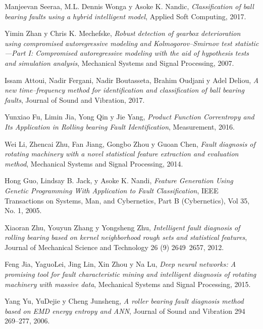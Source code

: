 \documentclass[12pt]{article}%
\begin{document}
\clearpage

\begin{thebibliography}{9}
Manjeevan Seeraa, M.L. Dennis Wonga y Asoke K. Nandic, \textit{Classification of ball bearing faults using a hybrid intelligent model}, Applied Soft Computing, 2017.

Yimin Zhan y Chris K. Mechefske, \textit{Robust detection of gearbox deterioration using compromised
autoregressive modeling and Kolmogorov–Smirnov test statistic—Part I: Compromised autoregressive modeling with the
aid of hypothesis tests and simulation analysis}, Mechanical Systems and Signal Processing, 2007.

Issam Attoui, Nadir Fergani, Nadir Boutasseta, Brahim Oudjani y Adel Deliou, \textit{A new time–frequency method for identification and classification of ball bearing faults}, Journal of Sound and Vibration, 2017.

Yunxiao Fu, Limin Jia, Yong Qin y Jie Yang, \textit{Product Function Correntropy and Its Application in Rolling bearing Fault Identification}, Measurement, 2016.

Wei Li, Zhencai Zhu, Fan Jiang, Gongbo Zhou y Guoan Chen, \textit{Fault diagnosis of rotating machinery with a novel statistical feature extraction and evaluation method}, Mechanical Systems and Signal Processing, 2014.

Hong Guo, Lindsay B. Jack, y Asoke K. Nandi, \textit{Feature Generation Using Genetic Programming With Application to Fault Classification}, IEEE Transactions on Systems, Man, and Cybernetics, Part B (Cybernetics), Vol 35, No. 1, 2005.

Xiaoran Zhu, Youyun Zhang y Yongsheng Zhu, \textit{Intelligent fault diagnosis of rolling bearing based on kernel neighborhood rough sets and statistical features}, Journal of Mechanical Science and Technology 26 (9) 2649~2657, 2012.

Feng Jia, YaguoLei, Jing Lin, Xin Zhou y Na Lu, \textit{Deep neural networks: A promising tool for fault characteristic mining and intelligent diagnosis of rotating machinery with massive data}, Mechanical Systems and Signal Processing, 2015.



Yang Yu, YuDejie y Cheng Junsheng, \textit{A roller bearing fault diagnosis method based
on EMD energy entropy and ANN}, Journal of Sound and Vibration 294 269–277, 2006. 


\end{thebibliography}
\end{document}
